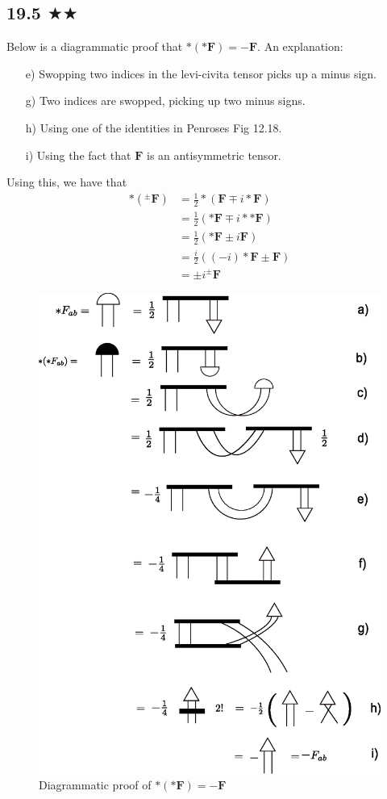 
\subsection{19.5 $\bigstar \bigstar$}
Below is a diagrammatic proof that $*(*\mathbf{F})=-\mathbf{F}$. An explanation:
\begin{itemize}
\item[e)] Swopping two indices in the levi-civita tensor picks up a minus sign.
\item[g)] Two indices are swopped, picking up two minus signs.
\item[h)] Using one of the identities in Penroses Fig 12.18.
\item[i)] Using the fact that $\mathbf{F}$ is an antisymmetric tensor.
\end{itemize}
Using this, we have that
\begin{align*}
*(^\pm \mathbf{F})&=\frac{1}{2}*(\mathbf{F}\mp i*\mathbf{F})\\
&=\frac{1}{2}(*\mathbf{F}\mp i**\mathbf{F})\\
&=\frac{1}{2}(*\mathbf{F}\pm i\mathbf{F})\\
&=\frac{i}{2}((-i)*\mathbf{F}\pm \mathbf{F})\\
&=\pm i^\pm \mathbf{F}
\end{align*}
\begin{figure}\label{e}
\includegraphics[scale=0.7]{chapters/images/19.5.eps}
\caption{Diagrammatic proof of $*(*\mathbf{F})=-\mathbf{F}$ }
\end{figure} 
